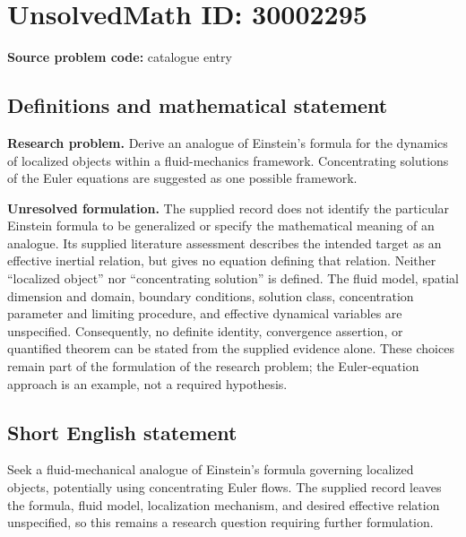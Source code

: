 \documentclass[11pt]{article}
\begin{document}
\section*{UnsolvedMath ID: 30002295}
\textbf{Source problem code:} catalogue entry
\subsection{Definitions and mathematical statement}
\textbf{Research problem.} Derive an analogue of Einstein's formula for the dynamics of localized objects within a fluid-mechanics framework. Concentrating solutions of the Euler equations are suggested as one possible framework.

\textbf{Unresolved formulation.} The supplied record does not identify the particular Einstein formula to be generalized or specify the mathematical meaning of an analogue. Its supplied literature assessment describes the intended target as an effective inertial relation, but gives no equation defining that relation. Neither ``localized object'' nor ``concentrating solution'' is defined. The fluid model, spatial dimension and domain, boundary conditions, solution class, concentration parameter and limiting procedure, and effective dynamical variables are unspecified. Consequently, no definite identity, convergence assertion, or quantified theorem can be stated from the supplied evidence alone. These choices remain part of the formulation of the research problem; the Euler-equation approach is an example, not a required hypothesis.
\subsection{Short English statement}
Seek a fluid-mechanical analogue of Einstein's formula governing localized objects, potentially using concentrating Euler flows. The supplied record leaves the formula, fluid model, localization mechanism, and desired effective relation unspecified, so this remains a research question requiring further formulation.
\end{document}
